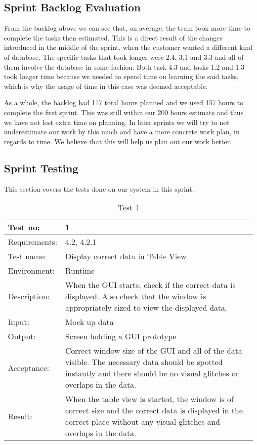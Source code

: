 \documentclass[../document.tex]{subfiles}
\begin{document}
\subsection{Sprint Backlog Evaluation}
From the backlog above we can see that, on average, the team took more time to complete the tasks then estimated. This is a direct result of the changes introduced in the middle of the sprint, when the customer wanted a different kind of database. The specific tasks that took longer were 2.4, 3.1 and 3.3 and all of them involve the database in some fashion. Both task 4.3 and tasks 1.2 and 1.3 took longer time because we needed to spend time on learning the said tasks, which is why the usage of time in this case was deemed acceptable.

As a whole, the backlog had 117 total hours planned and we used 157 hours to complete the first sprint. This was still within our 200 hours estimate and thus we have not lost extra time on planning. In later sprints we will try to not underestimate our work by this much and have a more concrete work plan, in regards to time. We believe that this will help us plan out our work better.

\subsection{Sprint Testing}

This section covers the tests done on our system in this sprint.

\begin{table}[H]
\caption{Test 1}
\begin{tabularx}{\textwidth}{|l|X|}
\hline
Test no:
&1
\\ \hline Requirements:
&4.2, 4.2.1
\\ \hline Test name:
&Display correct data in Table View
\\ \hline Environment:
&Runtime
\\ \hline Description:
&When the GUI starts, check if the correct data is displayed. Also check that the window is appropriately sized to view the displayed data.
\\ \hline Input:
&Mock up data
\\ \hline Output:
&Screen holding a GUI prototype
\\ \hline Acceptance:
&Correct window size of the GUI and all of the data visible. The necessary data should be spotted instantly and there should be no visual glitches or overlaps in the data.
\\ \hline Result:
&When the table view is started, the window is of correct size and the correct data is displayed in the correct place without any visual glitches and overlaps in the data.
\\ \hline
\end{tabularx}
\end{table}
\end{document}
